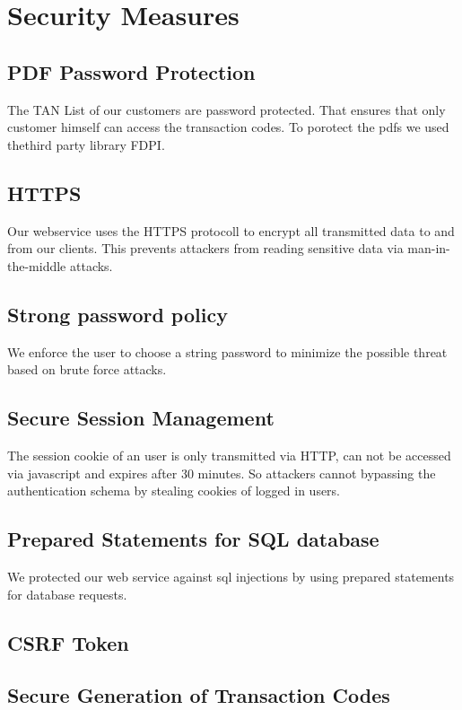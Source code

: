 \chapter{Security Measures}

\section{PDF Password Protection}
The TAN List of our customers are password protected. That ensures that only customer himself can access the transaction codes. To porotect the pdfs we used thethird party library FDPI.
\section{HTTPS}
Our webservice uses the HTTPS protocoll to encrypt all transmitted data to and from our clients.
This prevents attackers from reading sensitive data via man-in-the-middle attacks.
\section{Strong password policy}
We enforce the user to choose a string password to minimize the possible threat based on brute force attacks.
\section{Secure Session Management}
The session cookie of an user is only transmitted via HTTP, can not be accessed via javascript and expires after 30 minutes. So attackers cannot bypassing the authentication schema by stealing cookies of logged in users.
\section{Prepared Statements for SQL database}
We protected our web service against sql injections by using prepared statements for database requests.
\section{CSRF Token}
\section{Secure Generation of Transaction Codes}



